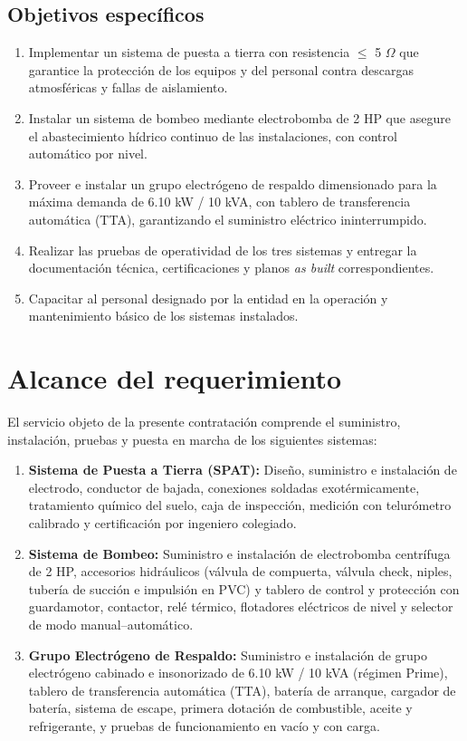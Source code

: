 \documentclass[12pt,a4paper]{article}
\begin{document}
\subsection{Objetivos específicos}

\begin{enumerate}
  \item Implementar un sistema de puesta a tierra con resistencia $\leq$ 5 $\Omega$ que garantice la protección de los equipos y del personal contra descargas atmosféricas y fallas de aislamiento.
  \item Instalar un sistema de bombeo mediante electrobomba de 2 HP que asegure el abastecimiento hídrico continuo de las instalaciones, con control automático por nivel.
  \item Proveer e instalar un grupo electrógeno de respaldo dimensionado para la máxima demanda de 6.10 kW / 10 kVA, con tablero de transferencia automática (TTA), garantizando el suministro eléctrico ininterrumpido.
  \item Realizar las pruebas de operatividad de los tres sistemas y entregar la documentación técnica, certificaciones y planos \emph{as built} correspondientes.
  \item Capacitar al personal designado por la entidad en la operación y mantenimiento básico de los sistemas instalados.
\end{enumerate}

\section{Alcance del requerimiento}

El servicio objeto de la presente contratación comprende el suministro, instalación, pruebas y puesta en marcha de los siguientes sistemas:

\begin{enumerate}
  \item \textbf{Sistema de Puesta a Tierra (SPAT):} Diseño, suministro e instalación de electrodo, conductor de bajada, conexiones soldadas exotérmicamente, tratamiento químico del suelo, caja de inspección, medición con telurómetro calibrado y certificación por ingeniero colegiado.

  \item \textbf{Sistema de Bombeo:} Suministro e instalación de electrobomba centrífuga de 2 HP, accesorios hidráulicos (válvula de compuerta, válvula check, niples, tubería de succión e impulsión en PVC) y tablero de control y protección con guardamotor, contactor, relé térmico, flotadores eléctricos de nivel y selector de modo manual--automático.

  \item \textbf{Grupo Electrógeno de Respaldo:} Suministro e instalación de grupo electrógeno cabinado e insonorizado de 6.10 kW / 10 kVA (régimen Prime), tablero de transferencia automática (TTA), batería de arranque, cargador de batería, sistema de escape, primera dotación de combustible, aceite y refrigerante, y pruebas de funcionamiento en vacío y con carga.
\end{enumerate}
\end{document}
